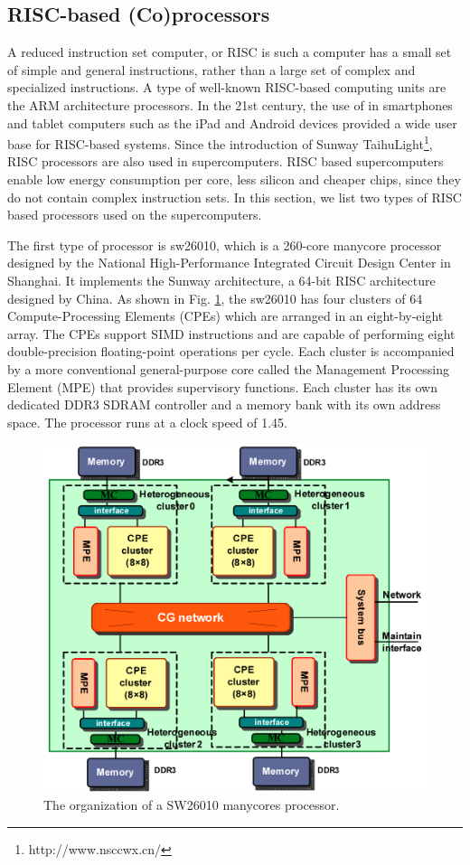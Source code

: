 \subsection{RISC-based (Co)processors}

A reduced instruction set computer, or RISC  is such a computer has a small set of simple and general instructions, rather than a large set of complex and specialized instructions. A type of well-known RISC-based computing units are the ARM architecture processors. In the 21st century, the use of in smartphones and tablet computers such as the iPad and Android devices provided a wide user base for RISC-based systems. Since the introduction of Sunway TaihuLight\footnote{http://www.nsccwx.cn/}, RISC processors are also used in supercomputers. RISC based supercomputers enable low energy consumption per core, less silicon and cheaper chips, since they do not contain complex instruction sets. In this section, we list two types of RISC based processors used on the supercomputers.

The first type of processor is sw26010, which is a 260-core manycore processor \cite{fu2016sunway} designed by the National High-Performance Integrated Circuit Design Center in Shanghai. It implements the Sunway architecture, a 64-bit RISC architecture designed by China. As shown in Fig. \ref{fig:sw26010}, the sw26010 has four clusters of 64 Compute-Processing Elements (CPEs) which are arranged in an eight-by-eight array. The CPEs support SIMD instructions and are capable of performing eight double-precision floating-point operations per cycle. Each cluster is accompanied by a more conventional general-purpose core called the Management Processing Element (MPE) that provides supervisory functions. Each cluster has its own dedicated DDR3 SDRAM controller and a memory bank with its own address space. The processor runs at a clock speed of 1.45.

\begin{figure}[htbp]
	\centering
	\includegraphics[width=4.6in]{fig/sw26010.png}
	\caption{The organization of a SW26010 manycores processor.}
	\label{fig:sw26010}
\end{figure}

